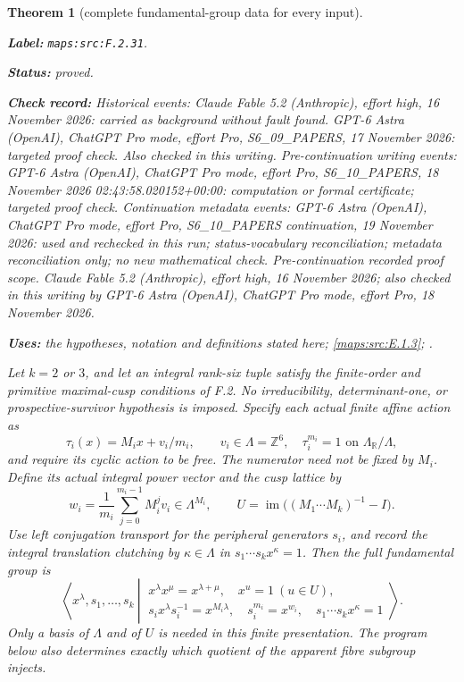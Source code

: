 \documentclass[11pt,a4paper]{article}
\newtheorem{theorem}{Theorem}[section]
\theoremstyle{definition}
\newcommand{\StatementRecord}[4]{\par\smallskip\begingroup\upshape\raggedright\noindent\textbf{Label:} \nolinkurl{#1}.\par\noindent\textbf{Status:} #2.\par\noindent\textbf{Check record:} #3.\par\noindent\textbf{Uses:} #4.\par\endgroup\smallskip}
\begin{document}
\begin{theorem}[complete fundamental-group data for every input]\label{maps:src:F.2.31}
\StatementRecord{maps:src:F.2.31}{proved}{Historical events: Claude Fable 5.2 (Anthropic), effort high, 16 November 2026: carried as background without fault found. GPT-6 Astra (OpenAI), ChatGPT Pro mode, effort Pro, S6\_09\_PAPERS, 17 November 2026: targeted proof check. Also checked in this writing. Pre-continuation writing events: GPT-6 Astra (OpenAI), ChatGPT Pro mode, effort Pro, S6\_10\_PAPERS, 18 November 2026 02:43:58.020152+00:00: computation or formal certificate; targeted proof check. Continuation metadata events: GPT-6 Astra (OpenAI), ChatGPT Pro mode, effort Pro, S6\_10\_PAPERS continuation, 19 November 2026: used and rechecked in this run; status-vocabulary reconciliation; metadata reconciliation only; no new mathematical check. \emph{Pre-continuation recorded proof scope.} Claude Fable 5.2 (Anthropic), effort high, 16 November 2026; also checked in this writing by GPT-6 Astra (OpenAI), ChatGPT Pro mode, effort Pro, 18 November 2026}{the hypotheses, notation and definitions stated here; \cref{maps:src:E.1.3}; \cite[Theorems 2.3--2.4, p.~425; Euler-characteristic comparison, pp.~427--428]{rootScott83}}


Let $k=2$ or $3$, and let an integral rank-six tuple satisfy the
finite-order and primitive maximal-cusp conditions of F.2.  No
irreducibility, determinant-one, or prospective-survivor hypothesis is
imposed.  Specify each actual finite affine action as
\[
 \tau_i(x)=M_ix+v_i/m_i,\qquad v_i\in\Lambda=\mathbb Z^6,
 \quad \tau_i^{m_i}=1\text{ on }\Lambda_{\mathbb R}/\Lambda,
 \tag{F.G1}\label{maps:eq:F.G1}
\]
and require its cyclic action to be free.  The numerator need not be
fixed by $M_i$.  Define its actual integral power vector and the cusp
lattice by
\[
 w_i=\frac1{m_i}\sum_{j=0}^{m_i-1}M_i^jv_i\in\Lambda^{M_i},
 \qquad U=\operatorname{im}\bigl((M_1\cdots M_k)^{-1}-I\bigr).
 \tag{F.G2}\label{maps:eq:F.G2}
\]
Use left conjugation transport for the peripheral generators $s_i$,
and record the integral translation clutching by $\kappa\in\Lambda$
in $s_1\cdots s_kx^\kappa=1$.  Then the full fundamental group is
\[
 \left\langle x^\lambda,s_1,\ldots,s_k\ \left|\
 \begin{array}{l}
 x^\lambda x^\mu=x^{\lambda+\mu},\quad x^u=1\ (u\in U),\\
 s_ix^\lambda s_i^{-1}=x^{M_i\lambda},\quad
 s_i^{m_i}=x^{w_i},\quad s_1\cdots s_kx^\kappa=1
 \end{array}\right.\right\rangle .                         \tag{F.G3}\label{maps:eq:F.G3}
\]
Only a basis of $\Lambda$ and of $U$ is needed in this finite
presentation.  The program below also determines exactly which
quotient of the apparent fibre subgroup injects.


\end{theorem}
\end{document}

